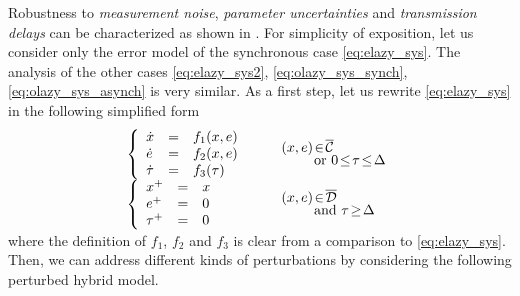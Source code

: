 \documentclass[twocolumn]{autart}
\begin{document}
{Robustness to \emph{measurement noise}, \emph{parameter uncertainties} and \emph{transmission delays} 
can be characterized as shown in \cite[p.57]{GoebelCSM09}. For simplicity of exposition, let 
us consider only the error model of the synchronous case \eqref{eq:elazy_sys}. The analysis of the
other cases \eqref{eq:elazy_sys2}, \eqref{eq:olazy_sys_synch}, \eqref{eq:olazy_sys_asynch} 
is very similar. As a first step, let us rewrite \eqref{eq:elazy_sys} 
in the following simplified form
\begin{equation}
\label{eq:rob_sys}
  \begin{array}{ll} 
	\left\{ \begin{array}{lll}
		\dot{x} &=& f_1(x,e)\\
		\dot{e} &=& f_2(x,e) \\
		\dot{\tau} &=& f_3(\tau) \\
	 \end{array}\right. & 
	 \begin{array}{l}
	  \quad
	  (x,e)\!\in\! \overline{\mathcal{C}} \vspace{-1mm}\\
	  \quad\qquad\mbox{ or } 0 \!\leq\! \tau \!\leq\! \Delta \\	  
	 \end{array} \\
	\left\{\begin{array}{lll}
		x^+ &=& x \\
		e^+ &=& 0\\ 
		\tau^+ &=& 0\\
	\end{array} \right. & 
	 \begin{array}{l}
	  \quad
	  (x,e)\!\in\! \overline{\mathcal{D}} \vspace{-1mm}\\
	  \quad\qquad\mbox{ and } \tau \!\geq\! \Delta \\	  
	 \end{array} \vspace{-2mm}\\ 
 \end{array} \vspace{1mm}
\end{equation}
where the definition of $f_1$, $f_2$ and $f_3$ is clear from a comparison to \eqref{eq:elazy_sys}.
Then, we can address different kinds of perturbations by considering the following 
perturbed hybrid model.
\begin{equation}
\label{eq:rob_sys1}
  \begin{array}{ll} 

\end{array}
\end{equation}}
\end{document}
